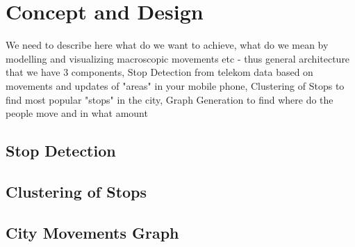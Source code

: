 \chapter{Concept and Design}
\label{cha:conceptanddesign}


We need to describe here what do we want to achieve, what do we mean by modelling and visualizing macroscopic movements etc - thus general architecture that we have 3 components, Stop Detection from telekom data based on movements and updates of "areas" in your mobile phone, Clustering of Stops to find most popular "stops" in the city, Graph Generation to find where do the people move and in what amount

\section{Stop Detection}

\section{Clustering of Stops}

\section{City Movements Graph}